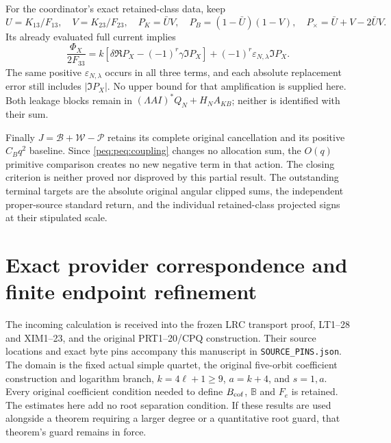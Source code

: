 \documentclass[11pt,a4paper]{article}
\begin{document}
For the coordinator's exact retained-class data, keep
\[
 U=K_{13}/F_{13},\quad V=K_{23}/F_{23},\quad
 P_K=\bar UV,\quad P_B=(1-\bar U)(1-V),\quad
 P_\times=\bar U+V-2\bar UV.
\]
Its already evaluated full current implies
\[
 \frac{\Phi_X}{2F_{33}}
 =k[\delta\Re P_X-(-1)^r\gamma\Im P_X]
       +(-1)^r\varepsilon_{N,\lambda}\Im P_X.
\]
The same positive $\varepsilon_{N,\lambda}$ occurs in all three terms, and each absolute replacement error still includes $|\Im P_X|$. No upper bound for that amplification is supplied here. Both leakage blocks remain in
$(\Lambda AI)^*Q_N+H_NA_{KB}$; neither is identified with their sum.

Finally $J=\mathcal B+\mathcal W-\mathcal P$ retains its complete original cancellation and its positive $C_Bq^2$ baseline. Since \eqref{peq:peq:coupling} changes no allocation sum, the $O(q)$ primitive comparison creates no new negative term in that action. The closing criterion is neither proved nor disproved by this partial result. The outstanding terminal targets are the absolute original angular clipped sums, the independent proper-source standard return, and the individual retained-class projected signs at their stipulated scale.

\section{Exact provider correspondence and finite endpoint refinement}
\label{peq:peq:intake}

The incoming calculation is received into the frozen LRC transport
proof, LT1--28 and XIM1--23, and the original PRT1--20/CPQ
construction. Their source locations and exact byte pins accompany this
manuscript in \texttt{SOURCE\_PINS.json}. The domain is the fixed actual
simple quartet, the original five-orbit coefficient construction and
logarithm branch, $k=4\ell+1\ge9$, $a=k+4$, and $s=1,a$.
Every original coefficient condition needed to define $B_{\rm cof}$,
$\mathbb B$ and $F_e$ is retained. The estimates here add no root
separation condition. If these results are used alongside a theorem
requiring a larger degree or a quantitative root guard, that theorem's
guard remains in force.
\end{document}
